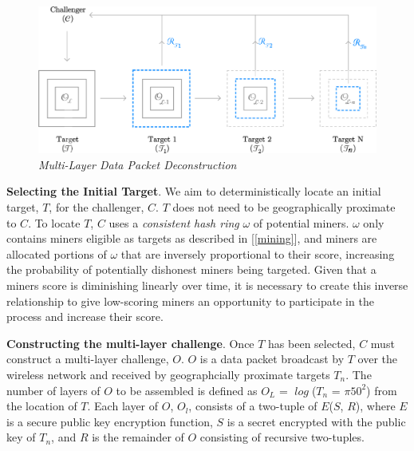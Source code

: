 \documentclass[letterpaper,11pt]{article}
\begin{document}
\begin{figure}[H]
	\begin{center}
  		\includegraphics[width=\textwidth]{diagram2.eps}
  		\caption{\emph{Multi-Layer Data Packet Deconstruction}}
  		\label{fig:poc-construction}
 	\end{center}
\end{figure}

\textbf{Selecting the Initial Target}. We aim to deterministically locate an initial target, $\mathit{T}$, for the challenger, $\mathit{C}$. $\mathit{T}$ does not need to be geographically proximate to $\mathit{C}$. To locate $\mathit{T}$, $\mathit{C}$ uses a \emph{consistent hash ring} $\mathit{\omega}$ of potential miners. $\mathit{\omega}$ only contains miners eligible as targets as described in [\ref{mining}], and miners are allocated portions of $\mathit{\omega}$ that are inversely proportional to their score, increasing the probability of potentially dishonest miners being targeted. Given that a miners score is diminishing linearly over time, it is necessary to create this inverse relationship to give low-scoring miners an opportunity to participate in the process and increase their score.\newline

\textbf{Constructing the multi-layer challenge}. Once $\mathit{T}$ has been selected, $\mathit{C}$ must construct a multi-layer challenge, $\mathit{O}$. $\mathit{O}$ is a data packet broadcast by $\mathit{T}$ over the wireless network and received by geographcially proximate targets $\mathit{T_n}$. The number of layers of $\mathit{O}$ to be assembled is defined as $\mathit{O_L}$ = $\mathit{\log}$($\mathit{T_n}$ = $\mathit{\pi}$$\mathit{50^2}$) from the location of $\mathit{T}$. Each layer of $\mathit{O}$, $\mathit{O_l}$, consists of a two-tuple of $\mathit{E}$($\mathit{S}$, $\mathit{R}$), where $\mathit{E}$ is a secure public key encryption function, $\mathit{S}$ is a secret encrypted with the public key of $\mathit{T_n}$, and $\mathit{R}$ is the remainder of $\mathit{O}$ consisting of recursive two-tuples.\newline
\end{document}
